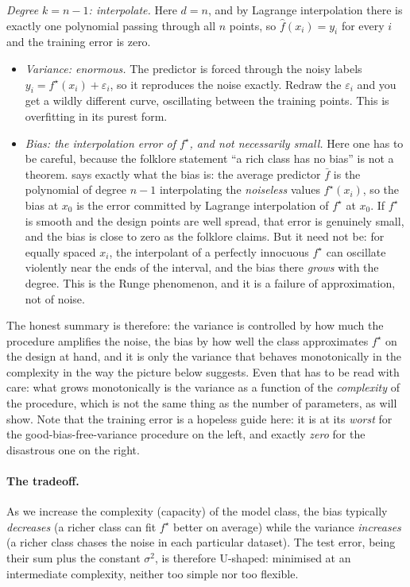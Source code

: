 \emph{Degree $k = n-1$: interpolate.} Here $d = n$, and by Lagrange interpolation
there is exactly one polynomial passing through all $n$ points, so $\hat f(x_i) =
y_i$ for every $i$ and the training error is zero.
\begin{itemize}
    \item \emph{Variance: enormous.} The predictor is forced through the noisy labels
    $y_i = f^\star(x_i) + \varepsilon_i$, so it reproduces the noise exactly. Redraw
    the $\varepsilon_i$ and you get a wildly different curve, oscillating between the
    training points. This is overfitting in its purest form.
    \item \emph{Bias: the interpolation error of $f^\star$, and not necessarily small.}
    Here one has to be careful, because the folklore statement ``a rich class has no
    bias'' is not a theorem.  says exactly what the bias is: the
    average predictor $\bar f$ is the polynomial of degree $n-1$ interpolating the
    \emph{noiseless} values $f^\star(x_i)$, so the bias at $x_0$ is the error committed
    by Lagrange interpolation of $f^\star$ at $x_0$. If $f^\star$ is smooth and the
    design points are well spread, that error is genuinely small, and the bias is close
    to zero as the folklore claims. But it need not be: for equally spaced $x_i$, the
    interpolant of a perfectly innocuous $f^\star$ can oscillate violently near the
    ends of the interval, and the bias there \emph{grows} with the degree. This is the
    Runge phenomenon, and it is a failure of approximation, not of noise.
\end{itemize}
The honest summary is therefore: the variance is controlled by how much the procedure
amplifies the noise, the bias by how well the class approximates $f^\star$ on the
design at hand, and it is only the variance that behaves monotonically in the
complexity in the way the picture below suggests. Even that has to be read with care:
what grows monotonically is the variance as a function of the \emph{complexity} of the
procedure, which is not the same thing as the number of parameters, as
 will show.
Note that the training error is a hopeless guide here: it is at its \emph{worst} for
the good-bias-free-variance procedure on the left, and exactly \emph{zero} for the
disastrous one on the right.

\paragraph{The tradeoff.}
As we increase the complexity (capacity) of the model class, the bias typically
\emph{decreases} (a richer class can fit $f^\star$ better on average) while the
variance \emph{increases} (a richer class chases the noise in each particular
dataset). The test error, being their sum plus the constant $\sigma^2$, is
therefore U-shaped: minimised at an intermediate complexity, neither too simple nor
too flexible.

